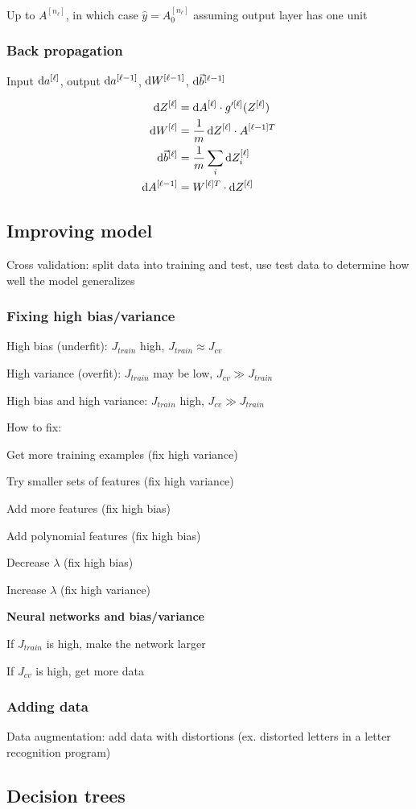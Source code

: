 \documentclass[12pt]{article}
\begin{document}
Up to $A^{[n_{\ell}]}$, in which case $\hat{y} = A^{[n_{\ell}]}_0$ assuming output layer has one unit

\subsubsection{Back propagation}

Input $\mathop{}\!\mathrm{d} a^{[\ell]}$, output $\mathop{}\!\mathrm{d} a^{[\ell-1]}$, $\mathop{}\!\mathrm{d} W^{[\ell-1]}$, $\mathop{}\!\mathrm{d} \vec{b}^{[\ell-1]}$

\begin{align*}
    \dif Z^{[\ell]} &= \dif A^{[\ell]} \cdot g'^{[\ell]}(Z^{[\ell]})\\
    \dif W^{[\ell]} &= \frac{1}{m} \dif Z^{[\ell]} \cdot A^{[\ell-1] T}\\
    \dif \vec{b}^{[\ell]} &= \frac{1}{m} \sum_i \dif Z^{[\ell]}_i\\
    \dif A^{[\ell-1]} &= W^{[\ell] T} \cdot \dif Z^{[\ell]}
\end{align*}

\subsection{Improving model}

Cross validation: split data into training and test, use test data to determine how well the model generalizes

\subsubsection{Fixing high bias/variance}

High bias (underfit): $J_{train}$ high, $J_{train} \approx J_{cv}$

High variance (overfit): $J_{train}$ may be low, $J_{cv} \gg J_{train}$

High bias and high variance: $J_{train}$ high, $J_{cv} \gg J_{train}$

How to fix:

\begin{myenumerate}
\item Get more training examples (fix high variance)
\item Try smaller sets of features (fix high variance)
\item Add more features (fix high bias)
\item Add polynomial features (fix high bias)
\item Decrease $\lambda$ (fix high bias)
\item Increase $\lambda$ (fix high variance)
\end{myenumerate}

\textbf{Neural networks and bias/variance}

If $J_{train}$ is high, make the network larger

If $J_{cv}$ is high, get more data

\subsubsection{Adding data}

Data augmentation: add data with distortions (ex. distorted letters in a letter recognition program)

\subsection{Decision trees}
\end{document}
